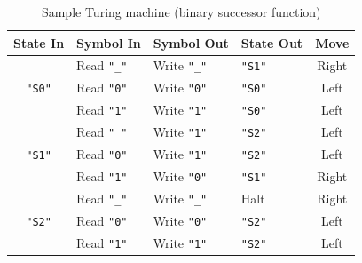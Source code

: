 \documentclass[11pt]{article}
\def\t#1{\texttt{#1}}
\begin{document}
\begin{table}[b]
  \centering
  \begin{tabular}{cl|llc}
    \textbf{State In} & \textbf{Symbol In} & \textbf{Symbol Out} & \textbf{State Out} & \textbf{Move} \\ \hline
                   & Read \t{"\_"} & Write \t{"\_"} & \t{"S1"} & Right \\
    \t{"S0"}       & Read \t{"0"}  & Write \t{"0"}  & \t{"S0"} & Left  \\
                   & Read \t{"1"}  & Write \t{"1"}  & \t{"S0"} & Left  \\ \cline{1-5}
                   & Read \t{"\_"} & Write \t{"1"}  & \t{"S2"} & Left  \\
    \t{"S1"}       & Read \t{"0"}  & Write \t{"1"}  & \t{"S2"} & Left  \\
                   & Read \t{"1"}  & Write \t{"0"}  & \t{"S1"} & Right \\ \cline{1-5}
                   & Read \t{"\_"} & Write \t{"\_"} & Halt     & Right \\ 
    \t{"S2"}       & Read \t{"0"}  & Write \t{"0"}  & \t{"S2"} & Left  \\
                   & Read \t{"1"}  & Write \t{"1"}  & \t{"S2"} & Left  
  \end{tabular}
  \caption{Sample Turing machine (binary successor function)}
  \label{tab:tm}
\end{table}
\end{document}
